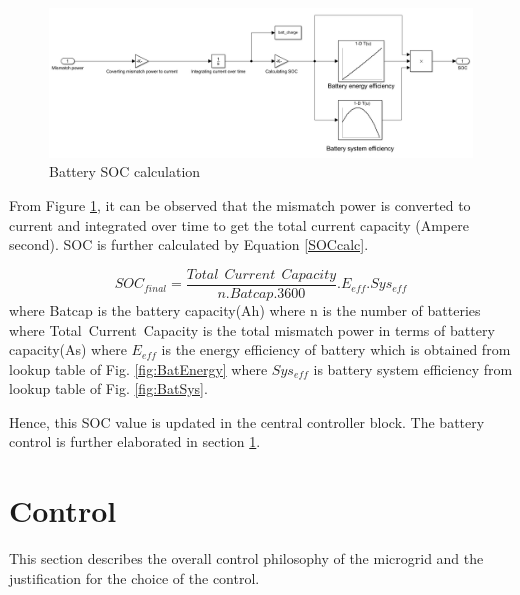 \begin{figure}[H]
    \centering
    \includegraphics[width = 0.9 \linewidth]{Final_report/Images/batt_soc_calc.PNG}
    \caption{Battery SOC calculation}
    \label{fig:BatSOC}
\end{figure}

From Figure \ref{fig:BatSOC}, it can be observed that the mismatch power is converted to current and integrated over time to get the total current capacity (Ampere second). SOC is further calculated by Equation \ref{SOCcalc}.

\begin{equation}\label{SOCcalc}
   SOC_{final} = \frac{Total\ \ Current \ \ Capacity}{n.Batcap.3600}.E_{eff}. Sys_{eff}
\end{equation}
\newline 
where Batcap is the battery capacity(Ah)
\newline where n is the number of batteries
\newline where Total\ Current\ Capacity is the total mismatch power in terms of battery capacity(As)
\newline where $E_{eff}$ is the energy efficiency of battery which is obtained from lookup table of Fig. \ref{fig:BatEnergy}
\newline where  $Sys_{eff}$ is battery system efficiency from lookup table of Fig. \ref{fig:BatSys}. \newline

\noindent Hence, this SOC value is updated in the central controller block. The battery control is further elaborated in section \ref{sec:control}. 
 

\newpage


\section{Control}  \label{sec:control}

This section describes the overall control philosophy of the microgrid and the justification for the choice of the control.\\

